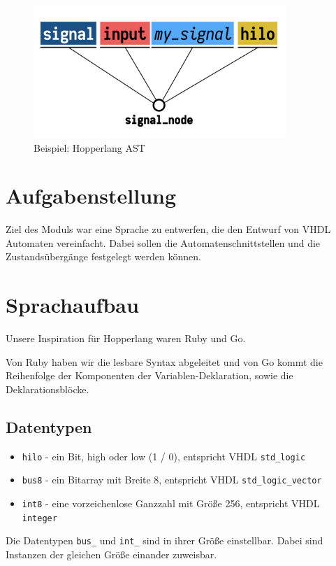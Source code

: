 \documentclass{htw}
\begin{document}
\begin{figure}[h]
    \centering
    \includegraphics[height=5cm]{res/parser.png}
    \caption{Beispiel: Hopperlang AST}\label{fig:ast}
\end{figure}

\section{Aufgabenstellung}

Ziel des Moduls war eine Sprache zu entwerfen, die den Entwurf von VHDL Automaten vereinfacht.
Dabei sollen die Automatenschnittstellen und die Zustandsübergänge festgelegt werden können.

\section{Sprachaufbau}

Unsere Inspiration für Hopperlang waren Ruby und Go.

Von Ruby haben wir die lesbare Syntax abgeleitet und von Go kommt die Reihenfolge der Komponenten der Variablen-Deklaration, sowie die Deklarationsblöcke.

\subsection{Datentypen}

\begin{listing}[H]
\begin{itemize}
    \item \texttt{hilo} - ein Bit, high oder low (1 / 0), entspricht VHDL \texttt{std_logic}
    \item \texttt{bus8} - ein Bitarray mit Breite 8, entspricht VHDL \texttt{std_logic_vector}
    \item \texttt{int8} - eine vorzeichenlose Ganzzahl mit Größe 256, entspricht VHDL \texttt{integer}
\end{itemize}
Die Datentypen \texttt{bus_} und \texttt{int_} sind in ihrer Größe einstellbar. Dabei sind Instanzen der gleichen Größe einander zuweisbar.
\label{lst:hl_types}
\end{listing}
\end{document}

